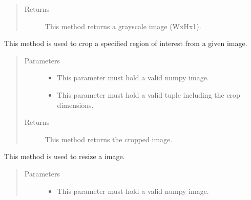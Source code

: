 \documentclass[letterpaper,10pt,english]{sphinxmanual}
\begin{document}
\begin{fulllineitems}
\begin{fulllineitems}
\begin{quote}
\begin{description}
\item[{Returns}] \leavevmode
This method returns a grayscale image (WxHx1).

\end{description}\end{quote}

\end{fulllineitems}


\begin{fulllineitems}
\label{\detokenize{PreProcessing:cmc.PreProcessing.PreProcessing.crop}}
This method is used to crop a specified region of interest from a given image.
\begin{quote}\begin{description}
\item[{Parameters}] \leavevmode\begin{itemize}
\item {} 
 \textendash{} This parameter must hold a valid numpy image.

\item {} 
 \textendash{} This parameter must hold a valid tuple including the crop dimensions.

\end{itemize}

\item[{Returns}] \leavevmode
This method returns the cropped image.

\end{description}\end{quote}

\end{fulllineitems}


\begin{fulllineitems}
\label{\detokenize{PreProcessing:cmc.PreProcessing.PreProcessing.resize}}
This method is used to resize a image.
\begin{quote}\begin{description}
\item[{Parameters}] \leavevmode\begin{itemize}
\item {} 
 \textendash{} This parameter must hold a valid numpy image.


\end{itemize}
\end{description}
\end{quote}
\end{fulllineitems}
\end{fulllineitems}
\end{document}
